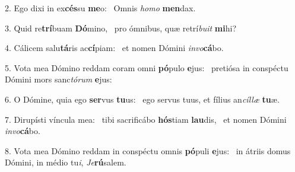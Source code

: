 2. Ego dixi in ex\textbf{cés}su \textbf{me}o: \ast\  Omnis \textit{ho}\textit{mo} \textbf{men}dax.\

3. Quid re\textbf{trí}buam \textbf{Dó}mino, \ast\  pro ómnibus, quæ retrí\textit{bu}\textit{it} \textbf{mi}hi?\

4. Cálicem salu\textbf{tá}ris ac\textbf{cí}piam: \ast\  et nomen Dómini \textit{in}\textit{vo}\textbf{cá}bo.\

5. Vota mea Dómino reddam coram omni \textbf{pó}pulo \textbf{e}jus: \ast\  pretiósa in conspéctu Dómini mors sanc\textit{tó}\textit{rum} \textbf{e}jus:\

6. O Dómine, quia ego \textbf{ser}vus \textbf{tu}us: \ast\  ego servus tuus, et fílius an\textit{cíl}\textit{læ} \textbf{tu}æ.\

7. Dirupísti víncula mea: \dag\  tibi sacrificábo \textbf{hós}tiam \textbf{lau}dis, \ast\  et nomen Dómini \textit{in}\textit{vo}\textbf{cá}bo.\

8. Vota mea Dómino reddam in conspéctu omnis \textbf{pó}puli \textbf{e}jus: \ast\  in átriis domus Dómini, in médio tu\textit{i}, \textit{Je}\textbf{rú}salem.\

